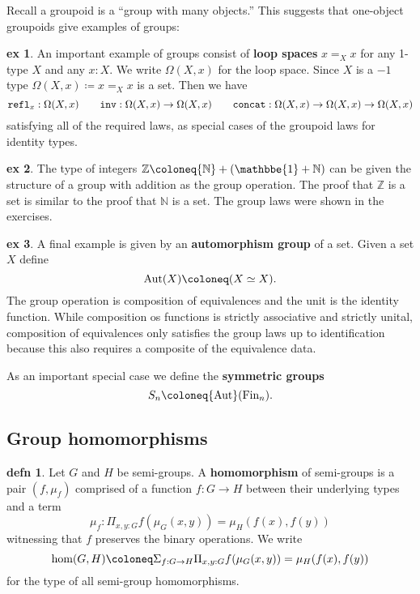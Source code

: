 \documentclass{amsart}
\theoremstyle{theorem}
\theoremstyle{definition}
\newtheorem*{defn}{defn}
\newtheorem*{ex}{ex}
\theoremstyle{remark}
\newcommand{\0}{\mathbbe{0}}
\newcommand{\1}{\mathbbe{1}}
\newcommand{\2}{\mathbbe{2}}
\newcommand{\3}{\mathbbe{3}}
\newcommand{\4}{\mathbbe{4}}
\newcommand{\term}[1]{{\textup{\texttt{#1}}}}
\newcommand{\type}[1]{{\textup{#1}}}
\newcommand{\bN}{{\mathbb{N}}}
\newcommand{\bZ}{{\mathbb{Z}}}
\newcommand{\refl}{\term{refl}}
\newcommand{\concat}{\term{concat}}
\newcommand{\inv}{\term{inv}}
\newcommand{\Fin}{\type{Fin}}
\begin{document}
Recall a groupoid is a ``group with many objects.'' This suggests that one-object groupoids give examples of groups:

\begin{ex} An important example of groups consist of \textbf{loop spaces} $x=_Xx$ for any 1-type $X$ and any $x:X$. We write $\Omega(X,x)$ for the loop space. Since $X$ is a $-1$ type $\Omega(X,x) \coloneq x=_Xx$ is a set. Then we have
\[ \refl_x : \Omega(X,x) \qquad \inv : \Omega(X,x) \to \Omega(X,x) \qquad \concat : \Omega(X,x) \to \Omega(X,x) \to \Omega(X,x)\]
satisfying all of the required laws, as special cases of the groupoid laws for identity types.
\end{ex}

\begin{ex} The type of integers $\bZ \coloneq \bN + (\1 + \bN)$ can be given the structure of a group with addition as the group operation. The proof that $\bZ$ is a set is similar to the proof that $\bN$ is a set. The group laws were shown in the exercises.
\end{ex}

\begin{ex}
A final example is given by an \textbf{automorphism group} of a set. Given a set $X$ define
\[ \type{Aut}(X) \coloneq (X \simeq X).\]
The group operation is composition of equivalences and the unit is the identity function. While composition os functions is strictly associative and strictly unital, composition of equivalences only satisfies the group laws up to identification because this also requires a composite of the equivalence data.

As an important special case we define the \textbf{symmetric groups}
\[ S_n \coloneq \type{Aut}(\Fin_n).\]
\end{ex}

\subsection*{Group homomorphisms}

\begin{defn} Let $G$ and $H$ be semi-groups. A \textbf{homomorphism} of semi-groups is a pair $(f,\mu_f)$ comprised of a function $f \colon G \to H$ between their underlying types and a term
\[ \mu_f : \Pi_{x,y:G} f(\mu_G(x,y)) = \mu_H(f(x),f(y))\]
witnessing that $f$ preserves the binary operations. We write
\[ \type{hom}(G,H) \coloneq \Sigma_{f:G \to H} \Pi_{x,y:G}  f(\mu_G(x,y)) = \mu_H(f(x),f(y))\]
for the type of all semi-group homomorphisms.
\end{defn}
\end{document}
